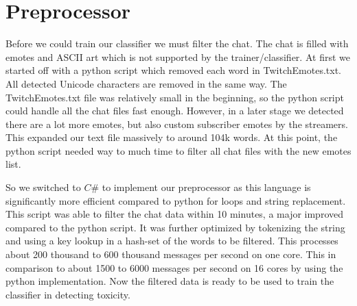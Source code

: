 \documentclass[final]{report}
\begin{document}
\section{Preprocessor}
Before we could train our classifier we must filter the chat.
The chat is filled with emotes and ASCII art which is not supported by the trainer/classifier.
At first we started off with a python script which removed each word in TwitchEmotes.txt.
All detected Unicode characters are removed in the same way.
The TwitchEmotes.txt file was relatively small in the beginning, so the python script could handle all the chat files fast enough.
However, in a later stage we detected there are a lot more emotes, but also custom subscriber emotes by the streamers.
This expanded our text file massively to around 104k words. 
At this point, the python script needed way to much time to filter all chat files with the new emotes list.

So we switched to $C\#$ to implement our preprocessor as this language is significantly more efficient compared to python for loops and string replacement.
This script was able to filter the chat data within 10 minutes, a major improved compared to the python script.
It was further optimized by tokenizing the string and using a key lookup in a hash-set of the words to be filtered.
This processes about 200 thousand to 600 thousand messages per second on one core.
This in comparison to about 1500 to 6000 messages per second on 16 cores by using the python implementation.
Now the filtered data is ready to be used to train the classifier in detecting toxicity.
\end{document}
